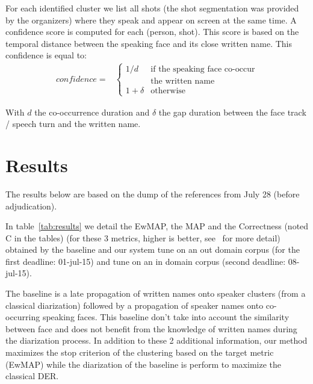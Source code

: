 \documentclass{acm_proc_article-me}
\begin{document}
For each identified cluster we list all shots (the shot segmentation was provided by the organizers) where they speak and appear on screen at the same time. A confidence score is computed for each (person, shot). This score is based on the temporal distance between the speaking face and its close written name. This confidence is equal to:
\begin{align*}
  confidence = & \left\{ 
  	\begin{array}{ll}
  		1/d  & \mbox{if the speaking face co-occur}  \\
  		 	 & \mbox{the written name}		\\
  		1+\delta &\mbox{otherwise}
  	\end{array} 
  \right.
\end{align*}

With $d$ the co-occurrence duration and $\delta$ the gap duration between the face track / speech turn and the written name.




\section{Results}

The results below are based on the dump of the references from July 28 (before adjudication). 

In table~\ref{tab:results} we detail the EwMAP, the MAP and the Correctness (noted C in the tables) (for these 3 metrics, higher is better, see~\cite{POIGNANT--MEDIAEVAL--2015} for more detail) obtained by the baseline and our system tune on an out domain corpus (for the first deadline: 01-jul-15) and tune on an in domain corpus (second deadline: 08-jul-15).

The baseline is a late propagation of written names onto speaker clusters (from a classical diarization) followed by a propagation of speaker names onto co-occurring speaking faces. This baseline don't take into account the similarity between face and does not benefit from the knowledge of written names during the diarization process. In addition to these 2 additional information, our method maximizes the stop criterion of the clustering based on the target metric (EwMAP) while the diarization of the baseline is perform to maximize the classical DER. 
\end{document}
